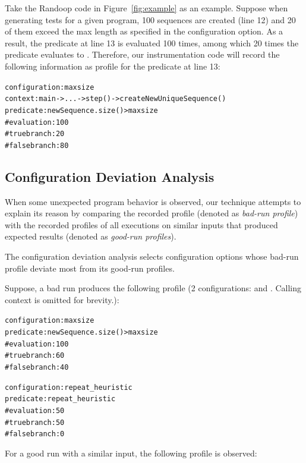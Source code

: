 Take the Randoop code in Figure~\ref{fig:example} as an example. Suppose when
generating tests for a given program, 100 sequences are created (line 12) and 20
of them exceed the max length as specified in the  configuration option.
As a result, the predicate at line 13 is evaluated 100 times, among which 20 times the
predicate evaluates to . Therefore,
our instrumentation code will record the following information as profile for the predicate
at line 13:


\begin{CodeOut}
\begin{alltt}
configuration: maxsize
context: main -> ... -> step() - > createNewUniqueSequence()
predicate: newSequence.size() > maxsize
    \# evaluation: 100
    \# true branch: 20
    \# false branch: 80
\end{alltt}
\end{CodeOut}

\subsection{Configuration Deviation Analysis}
\label{sec:analysis}

When some unexpected program behavior is observed, our technique
attempts to explain its reason by comparing the recorded profile (denoted
as \textit{bad-run profile}) with the recorded profiles of all
executions on similar inputs that produced expected results (denoted as \textit{good-run profiles}).

The configuration deviation analysis selects configuration
options whose bad-run profile deviate most from its good-run profiles.

Suppose, a bad run produces the following profile (2 configurations: 
and . Calling context is omitted for brevity.):

\begin{CodeOut}
\begin{alltt}
configuration: maxsize 
predicate: newSequence.size() > maxsize
    \# evaluation: 100
    \# true branch: 60
    \# false branch: 40

configuration: repeat_heuristic
predicate: repeat_heuristic
    \# evaluation: 50
    \# true branch: 50
    \# false branch: 0
\end{alltt}
\end{CodeOut}

For a good run with a similar input, the following profile is observed:

